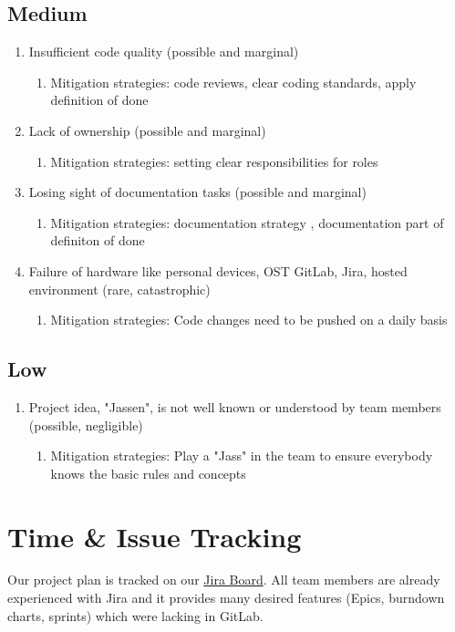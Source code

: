\subsection{Medium}
\begin{enumerate}
    \item Insufficient code quality (possible and marginal) 
    \begin{enumerate}
        \item Mitigation strategies: code reviews, clear coding standards, apply definition of done 
    \end{enumerate}

    \item Lack of ownership (possible and marginal) 
    \begin{enumerate}
        \item Mitigation strategies: setting clear responsibilities for roles 
    \end{enumerate}

    \item Losing sight of documentation tasks (possible and marginal) 
    \begin{enumerate}
        \item Mitigation strategies: documentation strategy , documentation part of definiton of done 
    \end{enumerate}

    \item Failure of hardware like personal devices, OST GitLab, Jira, hosted environment (rare, catastrophic) 
    \begin{enumerate}
        \item Mitigation strategies: Code changes need to be pushed on a daily basis 
    \end{enumerate}
\end{enumerate}

\subsection{Low}
\begin{enumerate}
    \item Project idea, "Jassen", is not well known or understood by team members (possible, negligible) 
    \begin{enumerate}
        \item Mitigation strategies:  Play a "Jass" in the team to ensure everybody knows the basic rules and concepts 
    \end{enumerate}
\end{enumerate}

\section{Time \& Issue Tracking} \label{sec:TimeAndIssueTracking}

Our project plan is tracked on our \href{https://jasstracker-jira.atlassian.net/browse/JASS}{Jira Board}.
All team members are already experienced with Jira and it provides many desired features (Epics, burndown charts, sprints) which were lacking in GitLab.
